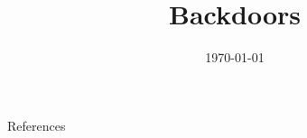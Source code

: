 \documentclass[aspectratio=169]{beamer}
\title{Backdoors}
\subtitle{\coursetitle}
\author{\instructor}
\date{\today}
\begin{document}
\begin{frame}
\titlepage
\end{frame}

\navoverview


\begin{frame}[allowframebreaks]{References}
\printbibliography[heading=none]
\end{frame}
\end{document}
